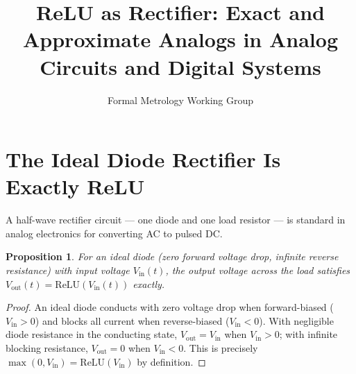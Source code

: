 \documentclass[10pt,journal,compsoc]{IEEEtran}
\newtheorem{proposition}{Proposition}
\begin{document}
\title{ReLU as Rectifier: Exact and Approximate Analogs in Analog Circuits and Digital Systems}
\author{Formal Metrology Working Group}


\maketitle

\section{The Ideal Diode Rectifier Is Exactly ReLU}
A half-wave rectifier circuit — one diode and one load resistor — is standard in analog electronics for converting AC to pulsed DC.

\begin{proposition}
For an ideal diode (zero forward voltage drop, infinite reverse resistance) with input voltage $V_{\mathrm{in}}(t)$, the output voltage across the load satisfies $V_{\mathrm{out}}(t) = \mathrm{ReLU}(V_{\mathrm{in}}(t))$ exactly.
\end{proposition}
\begin{proof}
An ideal diode conducts with zero voltage drop when forward-biased ($V_{\mathrm{in}}>0$) and blocks all current when reverse-biased ($V_{\mathrm{in}}<0$). With negligible diode resistance in the conducting state, $V_{\mathrm{out}}=V_{\mathrm{in}}$ when $V_{\mathrm{in}}>0$; with infinite blocking resistance, $V_{\mathrm{out}}=0$ when $V_{\mathrm{in}}<0$. This is precisely $\max(0,V_{\mathrm{in}}) = \mathrm{ReLU}(V_{\mathrm{in}})$ by definition.
\end{proof}
\end{document}
